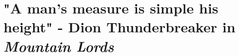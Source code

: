 \documentclass{article}
\begin{document}
%
%
%
%
%
%
%

\section*{"A man's measure is simple his height" - Dion Thunderbreaker in \textit{Mountain Lords}}
\end{document}
